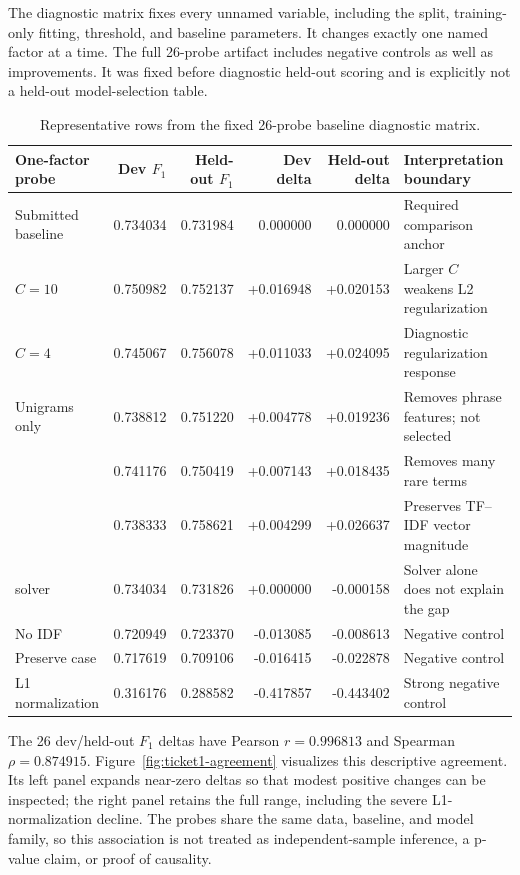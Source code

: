 \documentclass[10pt]{article}
\newcommand{\code}[1]{\texttt{\detokenize{#1}}}
\newcommand{\fscore}{\ensuremath{F_1}}
\begin{document}
The diagnostic matrix fixes every unnamed variable, including the split, training-only fitting, threshold, and baseline parameters. It changes exactly one named factor at a time. The full 26-probe artifact includes negative controls as well as improvements. It was fixed before diagnostic held-out scoring and is explicitly not a held-out model-selection table.

\begin{table}[htbp]
\centering
\scriptsize
\begin{tabularx}{\textwidth}{Y r r r r Y}
\toprule
One-factor probe & Dev \fscore{} & Held-out \fscore{} & Dev delta & Held-out delta & Interpretation boundary \\
\midrule
Submitted baseline & 0.734034 & 0.731984 & 0.000000 & 0.000000 & Required comparison anchor \\

$C=10$ & 0.750982 & 0.752137 & +0.016948 & +0.020153 & Larger $C$ weakens L2 regularization \\
$C=4$ & 0.745067 & 0.756078 & +0.011033 & +0.024095 & Diagnostic regularization response \\
Unigrams only & 0.738812 & 0.751220 & +0.004778 & +0.019236 & Removes phrase features; not selected \\
\code{min_df=3} & 0.741176 & 0.750419 & +0.007143 & +0.018435 & Removes many rare terms \\
\code{norm=None} & 0.738333 & 0.758621 & +0.004299 & +0.026637 & Preserves TF--IDF vector magnitude \\
\code{lbfgs} solver & 0.734034 & 0.731826 & +0.000000 & -0.000158 & Solver alone does not explain the gap \\
No IDF & 0.720949 & 0.723370 & -0.013085 & -0.008613 & Negative control \\
Preserve case & 0.717619 & 0.709106 & -0.016415 & -0.022878 & Negative control \\
L1 normalization & 0.316176 & 0.288582 & -0.417857 & -0.443402 & Strong negative control \\
\bottomrule
\end{tabularx}
\caption{Representative rows from the fixed 26-probe baseline diagnostic matrix.}
\label{tab:ticket1-probes}
\end{table}

The 26 dev/held-out \fscore{} deltas have Pearson $r=0.996813$ and Spearman $\rho=0.874915$. Figure~\ref{fig:ticket1-agreement} visualizes this descriptive agreement. Its left panel expands near-zero deltas so that modest positive changes can be inspected; the right panel retains the full range, including the severe L1-normalization decline. The probes share the same data, baseline, and model family, so this association is not treated as independent-sample inference, a p-value claim, or proof of causality.
\end{document}
